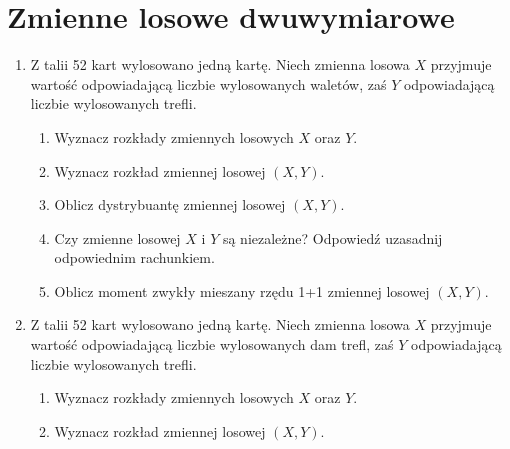 \documentclass{mwart}
\newcommand{\ans}[1]{}
\newcommand{\ans}[1]{\emph{Odpowiedź:} #1}
\begin{document}
\clearpage
\section{Zmienne losowe dwuwymiarowe}
\begin{enumerate}
\item Z talii 52 kart wylosowano jedną kartę. Niech zmienna losowa $X$ przyjmuje wartość odpowiadającą liczbie wylosowanych waletów, zaś $Y$ odpowiadającą liczbie wylosowanych trefli.
\begin{enumerate}
\item Wyznacz rozkłady zmiennych losowych $X$ oraz $Y$. \ans{$P(X=0)=\frac{48}{52} P(X=1)=\frac{4}{52} P(Y=1)=\frac{13}{52} P(Y=0)=\frac{39}{52}$}
\item Wyznacz rozkład zmiennej losowej $(X,Y)$. \ans{$P(0,0)=\frac{36}{52} P(1,0)=\frac{3}{52} P(0,1)=\frac{12}{52} P(1,1)=\frac{1}{52}$}
\item Oblicz dystrybuantę zmiennej losowej $(X,Y)$. \ans{\[F(u,v)=\begin{cases} 
	0 & u\leq 0 \lor v\leq 0 \\ 
	\frac{36}{52} & 0<u\leq 1 \land 0<v\leq 1 \\
	\frac{39}{52} & u>1 \land 0<v\leq 1 \\
	\frac{48}{52} & 0<u\leq 1 \land v>1 \\
	1 & u>1 \land v>1
	\end{cases}\]}
\item Czy zmienne losowej $X$ i $Y$ są niezależne? Odpowiedź uzasadnij odpowiednim rachunkiem. \ans{Tak}
\item Oblicz moment zwykły mieszany rzędu 1+1 zmiennej losowej $(X,Y)$. \ans{$EXY=\frac{1}{52}$}
\end{enumerate}
\item Z talii 52 kart wylosowano jedną kartę. Niech zmienna losowa $X$ przyjmuje wartość odpowiadającą liczbie wylosowanych dam trefl, zaś $Y$ odpowiadającą liczbie wylosowanych trefli.
\begin{enumerate}
\item Wyznacz rozkłady zmiennych losowych $X$ oraz $Y$. \ans{$P(X=0)=\frac{51}{52} P(X=1)=\frac{1}{52} P(Y=1)=\frac{13}{52} P(Y=0)=\frac{39}{52}$}
\item Wyznacz rozkład zmiennej losowej $(X,Y)$. \ans{$P(0,0)=\frac{39}{52} P(1,0)=0 P(0,1)=\frac{12}{52} P(1,1)=\frac{1}{52}$}

\end{enumerate}
\end{enumerate}
\end{document}
